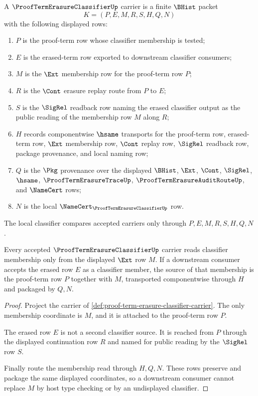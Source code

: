 \begin{definition}
\label{def:proof-term-erasure-classifier-carrier}
A $\ProofTermErasureClassifierUp$ carrier is a finite $\BHist$ packet
$$
K=(P,E,M,R,S,H,Q,N)
$$
with the following displayed rows:
\begin{enumerate}
\item $P$ is the proof-term row whose classifier membership is tested;
\item $E$ is the erased-term row exported to downstream classifier consumers;
\item $M$ is the $\Ext$ membership row for the proof-term row $P$;
\item $R$ is the $\Cont$ erasure replay route from $P$ to $E$;
\item $S$ is the $\SigRel$ readback row naming the erased classifier output as the public reading of the membership row $M$ along $R$;
\item $H$ records componentwise $\hsame$ transports for the proof-term row, erased-term row, $\Ext$ membership row, $\Cont$ replay row, $\SigRel$ readback row, package provenance, and local naming row;
\item $Q$ is the $\Pkg$ provenance over the displayed $\BHist$, $\Ext$, $\Cont$, $\SigRel$, $\hsame$, $\ProofTermErasureTraceUp$, $\ProofTermErasureAuditRouteUp$, and $\NameCert$ rows;
\item $N$ is the local $\NameCert_{\ProofTermErasureClassifierUp}$ row.
\end{enumerate}
The local classifier compares accepted carriers only through $P,E,M,R,S,H,Q,N$.
\end{definition}

\begin{theorem}
\label{thm:proof-term-erasure-classifier-ext-membership}
Every accepted $\ProofTermErasureClassifierUp$ carrier reads classifier membership only from the displayed $\Ext$ row $M$. If a downstream consumer accepts the erased row $E$ as a classifier member, the source of that membership is the proof-term row $P$ together with $M$, transported componentwise through $H$ and packaged by $Q,N$.
\end{theorem}
\begin{proof}
Project the carrier of \autoref{def:proof-term-erasure-classifier-carrier}. The only membership coordinate is $M$, and it is attached to the proof-term row $P$.

The erased row $E$ is not a second classifier source. It is reached from $P$ through the displayed continuation row $R$ and named for public reading by the $\SigRel$ row $S$.

Finally route the membership read through $H,Q,N$. These rows preserve and package the same displayed coordinates, so a downstream consumer cannot replace $M$ by host type checking or by an undisplayed classifier.
\end{proof}

